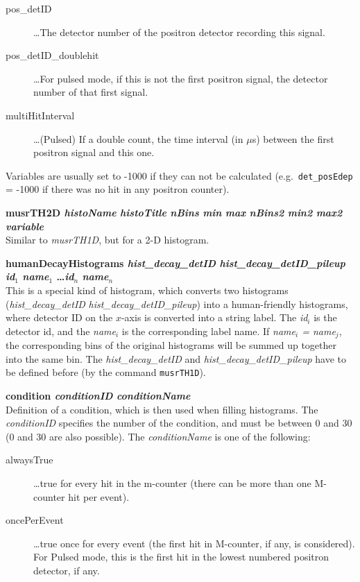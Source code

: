 \documentclass[twoside]{dis04}
\begin{document}
\begin{description}
\begin{description}
	\item[pos\_detID] \ldots The detector number of the positron detector recording this signal.
	\item[pos\_detID\_doublehit] \ldots For pulsed mode, if this is not the first positron signal, the detector number of that first signal.
	\item[multiHitInterval] \ldots (Pulsed) If a double count, the time interval (in $\mu$s) between the first positron signal and this one.
	 \end{description}
	 Variables are usually set to -1000 if they can not be calculated (e.g.\ {\tt det\_posEdep} = -1000 
	 if there was no hit in any positron counter).
   \item{\bf musrTH2D \emph{histoName} \emph{histoTitle} \emph{nBins} \emph{min} \emph{max} \emph{nBins2} \emph{min2} \emph{max2} \emph{variable}} \\
     Similar to \emph{musrTH1D}, but for a 2-D histogram.
   \item{\bf humanDecayHistograms \emph{hist\_decay\_detID} \emph{hist\_decay\_detID\_pileup}  \emph{id$_1$} \emph{name$_1$} \ldots \emph{id$_n$} \emph{name$_n$} } \\
     This is a special kind of histogram, which converts two histograms 
     (\emph{hist\_decay\_detID} \emph{hist\_decay\_detID\_pileup})
     into a human-friendly histograms, where detector ID on the $x$-axis is converted into a string label.
     The \emph{id$_i$} is the detector id, and the \emph{name$_i$} is the corresponding label name.
     If \emph{name$_i$ = name$_j$}, the corresponding bins of the original histograms will 
     be summed up together into the same bin.
     The \emph{hist\_decay\_detID} and \emph{hist\_decay\_detID\_pileup} have to be defined before
     (by the command {\tt musrTH1D}).
   \item{\bf condition \emph{conditionID} \emph{conditionName}} \\
     Definition of a condition, which is then used when filling histograms.  The \emph{conditionID} 
     specifies the number of the condition, and must be between 0 and 30 (0 and 30 are also possible).  
     The \emph{conditionName} is one of the following:
     \begin{description}
        \item[alwaysTrue]              \ldots  true for every hit in the m-counter (there can be more than one M-counter hit per event).
	\item[oncePerEvent]            \ldots  true once for every event (the first hit in M-counter, if any, is considered). For Pulsed mode, this is the first hit in the lowest numbered positron detector, if any.

\end{description}
\end{description}
\end{document}
